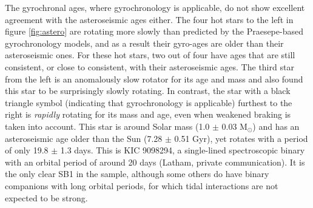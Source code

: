 \documentclass[useAMS, usenatbib, preprint, 12pt]{aastex}
\newcommand{\racomment}[1]{{\bf #1}}
\begin{document}
The gyrochronal ages, where gyrochronology is applicable, do not show
excellent agreement with the asteroseismic ages either.
The four hot stars to the left in figure \ref{fig:astero} are rotating more
slowly than predicted by the Praesepe-based gyrochronology models, and as a
result their gyro-ages are older than their asteroseismic ones.
For these hot stars, two out of four have ages that are still consistent, or
close to consistent, with their asteroseismic ages.
The third star from the left is an anomalously slow rotator for its age and
mass and \citet{vansaders2016} also found this star to be surprisingly slowly
rotating.
In contrast, the star with a black triangle symbol (indicating that
gyrochronology is applicable) furthest to the right is {\it rapidly} rotating
for its mass and age, even when weakened braking is taken into account.
This star is around Solar mass (1.0 $\pm$ 0.03 M$_\odot$) and has an
asteroseismic age older than the Sun (7.28 $\pm$ 0.51 Gyr), yet rotates with a
period of only 19.8 $\pm$ 1.3 days.
This is KIC 9098294, a single-lined spectroscopic binary with an orbital
period of around 20 days (Latham, private communication).
It is the only clear SB1 in the \citet{vansaders2016} sample, although some
others do have binary companions with long orbital periods, for which tidal
interactions are not expected to be strong.
\end{document}
